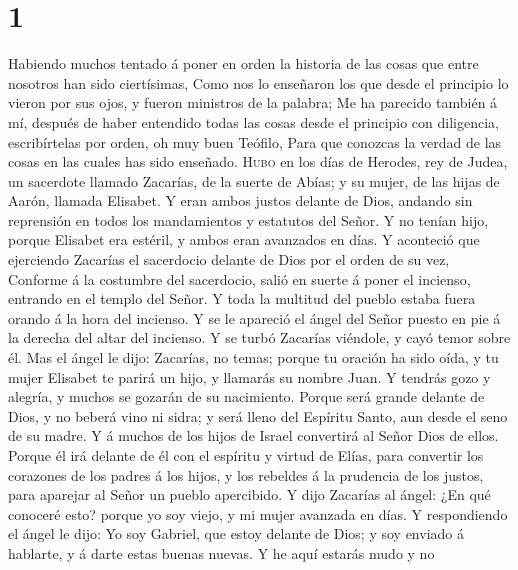 \hypertarget{section}{%
\section{1}\label{section}}

 Habiendo muchos tentado á poner en orden la historia de
las cosas que entre nosotros han sido ciertísimas,  Como
nos lo enseñaron los que desde el principio lo vieron por sus ojos, y
fueron ministros de la palabra;  Me ha parecido también á
mí, después de haber entendido todas las cosas desde el principio con
diligencia, escribírtelas por orden, oh muy buen Teófilo, 
Para que conozcas la verdad de las cosas en las cuales has sido
enseñado.  \textsc{Hubo} en los días de Herodes, rey de
Judea, un sacerdote llamado Zacarías, de la suerte de Abías; y su mujer,
de las hijas de Aarón, llamada Elisabet.  Y eran ambos
justos delante de Dios, andando sin reprensión en todos los mandamientos
y estatutos del Señor.  Y no tenían hijo, porque Elisabet
era estéril, y ambos eran avanzados en días.  Y aconteció
que ejerciendo Zacarías el sacerdocio delante de Dios por el orden de su
vez,  Conforme á la costumbre del sacerdocio, salió en
suerte á poner el incienso, entrando en el templo del Señor.
 Y toda la multitud del pueblo estaba fuera orando á la
hora del incienso.  Y se le apareció el ángel del Señor
puesto en pie á la derecha del altar del incienso.  Y se
turbó Zacarías viéndole, y cayó temor sobre él.  Mas el
ángel le dijo: Zacarías, no temas; porque tu oración ha sido oída, y tu
mujer Elisabet te parirá un hijo, y llamarás su nombre Juan.
 Y tendrás gozo y alegría, y muchos se gozarán de su
nacimiento.  Porque será grande delante de Dios, y no
beberá vino ni sidra; y será lleno del Espíritu Santo, aun desde el seno
de su madre.  Y á muchos de los hijos de Israel
convertirá al Señor Dios de ellos.  Porque él irá delante
de él con el espíritu y virtud de Elías, para convertir los corazones de
los padres á los hijos, y los rebeldes á la prudencia de los justos,
para aparejar al Señor un pueblo apercibido.  Y dijo
Zacarías al ángel: ¿En qué conoceré esto? porque yo soy viejo, y mi
mujer avanzada en días.  Y respondiendo el ángel le dijo:
Yo soy Gabriel, que estoy delante de Dios; y soy enviado á hablarte, y á
darte estas buenas nuevas.  Y he aquí estarás mudo y no
